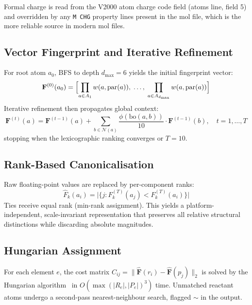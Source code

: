 \documentclass[12pt,a4paper]{article}
\begin{document}
Formal charge is read from the V2000 atom charge code field (atoms line,
field 5) and overridden by any \texttt{M~CHG} property lines present in
the mol file, which is the more reliable source in modern mol files.

\subsection{Vector Fingerprint and Iterative Refinement}

For root atom $a_0$, BFS to depth $d_{\max} = 6$ yields the initial
fingerprint vector:
\begin{equation}
  \mathbf{F}^{(0)}(a_0) =
    \Bigl[
      \prod_{a \in A_1} w(a, \mathrm{par}(a)),\;
      \ldots,\;
      \prod_{a \in A_{d_{\max}}} w(a, \mathrm{par}(a))
    \Bigr]
  \label{eq:initial}
\end{equation}
Iterative refinement then propagates global context:
\begin{equation}
  \mathbf{F}^{(t)}(a) = \mathbf{F}^{(t-1)}(a)
    + \sum_{b \in \mathcal{N}(a)}
      \frac{\phi(\mathrm{bo}(a,b))}{10} \cdot \mathbf{F}^{(t-1)}(b),
  \quad t = 1, \ldots, T
  \label{eq:refinement}
\end{equation}
stopping when the lexicographic ranking converges or $T = 10$.

\subsection{Rank-Based Canonicalisation}

Raw floating-point values are replaced by per-component ranks:
\begin{equation}
  \hat{F}_k(a_i) =
    \bigl|\{j : F^{(T)}_k(a_j) < F^{(T)}_k(a_i)\}\bigr|
  \label{eq:rank}
\end{equation}
Ties receive equal rank (min-rank assignment). This yields a
platform-independent, scale-invariant representation that preserves
all relative structural distinctions while discarding absolute magnitudes.

\subsection{Hungarian Assignment}

For each element $e$, the cost matrix $C_{ij} = \|\hat{\mathbf{F}}(r_i)
- \hat{\mathbf{F}}(p_j)\|_2$ is solved by the Hungarian
algorithm~\cite{kuhn1955} in $O(\max(|R_e|,|P_e|)^3)$ time.
Unmatched reactant atoms undergo a second-pass nearest-neighbour search,
flagged $\sim$ in the output.
\end{document}
